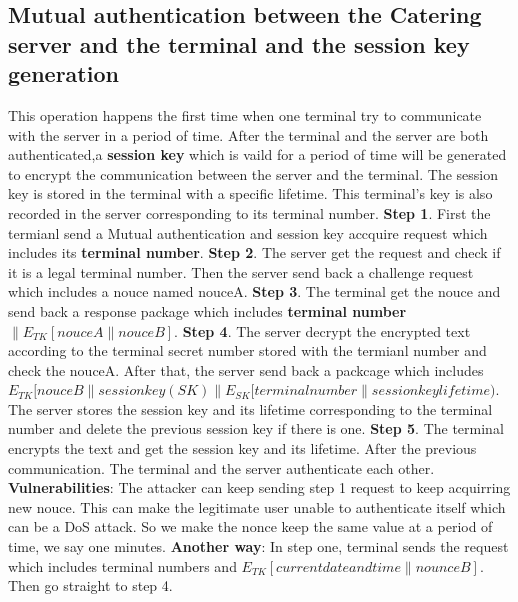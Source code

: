 \documentclass{article}
\begin{document}
        \subsection*{Mutual authentication between the Catering server and the terminal and the session key generation}
This operation happens the first time when one terminal try to communicate with the server in a period of time. 
        After the terminal and the server are both authenticated,a \textbf{session key} which is vaild for a period of time will be generated to encrypt the communication between the server and the terminal.
         The session key is stored in the terminal with a specific lifetime.
This terminal's key is also recorded in the server corresponding to its terminal number. 
        \newline
\textbf{Step 1}. First the termianl send a Mutual authentication and session key accquire request which includes its \textbf{terminal number}.
        \newline
\textbf{Step 2}. The server get the request and check if it is a legal terminal number.
Then the server send back a challenge request which includes a nouce named nouceA.
        \newline
\textbf{Step 3}. The terminal get the nouce and send back a response package which includes \textbf{  terminal number $\parallel E_{TK}[nouceA \parallel nouceB]$}. 
        \newline
\textbf{Step 4}. The server decrypt the encrypted text according to the terminal secret number stored with the termianl number and check the nouceA. 
After that, the server send back a packcage which includes  $E_{TK}[nouceB \parallel  session key(SK) \parallel E_{SK}[terminal number \parallel session key lifetime )$. 
The server stores the session key and its lifetime corresponding to the terminal number and delete the previous session key if there is one.  
        \newline
\textbf{Step 5}. The terminal encrypts the text and get the session key and its lifetime. 
After the previous communication.
The terminal and the server authenticate each other.
        \newline
\textbf{Vulnerabilities}: The attacker can keep sending  step 1 request to keep acquirring new nouce. 
This can make the legitimate user unable to authenticate itself which can be a DoS attack. 
So we make the nonce keep the same value at a period of time, we say one minutes.
        \newline
\textbf{Another way}:
In step one, terminal sends the request which includes terminal numbers and $E_{TK}[current date and time \parallel nounceB]$. 
Then go straight to step 4.
\end{document}
